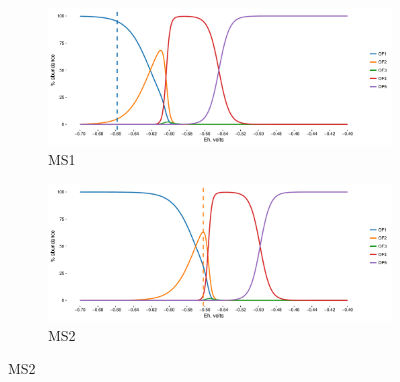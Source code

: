 \singlespace
\begin{figure}[h]
\centering

    \begin{subfigure}[b]{\linewidth}
       	\includegraphics[width=1\linewidth]{"figs_app2/Mound OF1_thermo"}
       	\caption{MS1}
        \label{fig:MS1_thermo}
    \end{subfigure}
    \begin{subfigure}[b]{\linewidth}
    	\includegraphics[width=1\linewidth]{"figs_app2/Mound OF2_thermo"}
    	\caption{MS2}
        \label{fig:MS2_thermo}
    \end{subfigure}
    
\end{figure}

\newpage

